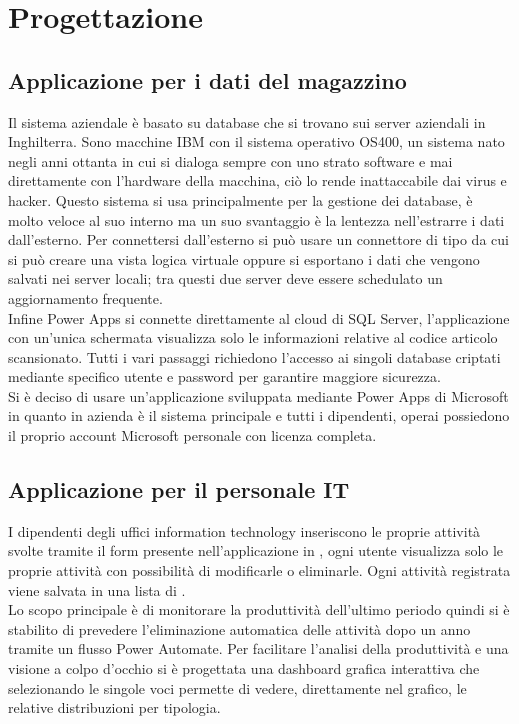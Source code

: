 \chapter{Progettazione}
\section{Applicazione per i dati del magazzino}
Il sistema aziendale  è basato su database  che si trovano sui server
aziendali in Inghilterra. Sono macchine IBM con il sistema operativo OS400, un sistema nato negli
anni ottanta in cui si dialoga sempre con uno strato software e mai direttamente con l’hardware
della macchina, ciò lo rende inattaccabile dai virus e hacker. Questo sistema si usa principalmente
per la gestione dei database, è molto veloce al suo interno ma un suo svantaggio è la lentezza
nell’estrarre i dati dall’esterno. Per connettersi dall’esterno si può usare un connettore di tipo 
da cui si può creare una vista logica virtuale oppure si esportano i dati che vengono
salvati nei server locali; tra questi due server deve essere schedulato un aggiornamento frequente.\\
Infine Power Apps si connette direttamente al cloud di SQL Server, l’applicazione con un’unica
schermata visualizza solo le informazioni relative al codice articolo scansionato. Tutti i vari passaggi
richiedono l’accesso ai singoli database criptati mediante specifico utente e password per garantire
maggiore sicurezza.\\
Si è deciso di usare un’applicazione sviluppata mediante Power Apps di
Microsoft in quanto in azienda è il sistema principale e tutti i dipendenti, operai possiedono il
proprio account Microsoft personale con licenza completa.

\newpage

\section{Applicazione per il personale IT}
I dipendenti degli uffici information technology inseriscono le proprie attività svolte tramite il form presente nell’applicazione in , ogni utente visualizza solo le proprie attività con possibilità di modificarle o eliminarle. 
Ogni attività registrata viene salvata in una lista di .\\
Lo scopo principale è di monitorare la produttività dell’ultimo periodo quindi si è stabilito di prevedere l’eliminazione automatica delle attività dopo un anno tramite un flusso Power Automate.
Per facilitare l’analisi della produttività e una visione a colpo d’occhio si è progettata una dashboard grafica interattiva che selezionando le singole voci permette di vedere, direttamente nel grafico, le relative distribuzioni per tipologia.

